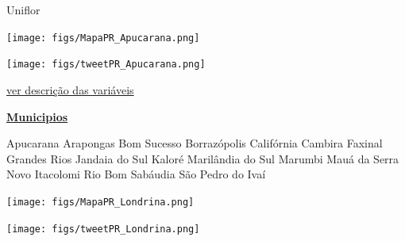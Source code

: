 \documentclass[10pt]{article} %
\begin{document}
\begin{minipage}[t]{.30\linewidth}
\begin{mdframed}[style=sidebar,frametitle={}]
\begin{itemize}
\gsquare Uniflor 
\end{itemize}\BackToContents\end{mdframed}\hfill\end{minipage}\newpage\begin{minipage}[t]{.66\linewidth}
\hypertarget{Apcr}{}
\texttt{[image: figs/MapaPR\_Apucarana.png]}\vspace{0.5cm}\vspace{0.5cm}\begin{center}
\texttt{[image: figs/tweetPR\_Apucarana.png]}\end{center}
\begin{center}

\end{center}
\small{\hyperlink{vartab}{ver descrição das variáveis}}\end{minipage}\hfill\begin{minipage}[t]{.30\linewidth}
\begin{mdframed}[style=sidebar,frametitle={}]
\textbf{\hyperlink{municips}{Municipios}}\begin{itemize}\gsquare Apucarana 
\gsquare Arapongas 
\gsquare Bom Sucesso 
\gsquare Borrazópolis 
\gsquare Califórnia 
\gsquare Cambira 
\gsquare Faxinal 
\gsquare Grandes Rios 
\gsquare Jandaia do Sul 
\gsquare Kaloré 
\gsquare Marilândia do Sul 
\gsquare Marumbi 
\gsquare Mauá da Serra 
\gsquare Novo Itacolomi 
\gsquare Rio Bom 
\gsquare Sabáudia 
\gsquare São Pedro do Ivaí 
\end{itemize}\BackToContents\end{mdframed}\hfill\end{minipage}\newpage\begin{minipage}[t]{.66\linewidth}
\hypertarget{Lndr}{}
\texttt{[image: figs/MapaPR\_Londrina.png]}\vspace{0.5cm}\vspace{0.5cm}\begin{center}
\texttt{[image: figs/tweetPR\_Londrina.png]}\end{center}
\begin{center}

\end{center}
\end{minipage}
\end{document}
